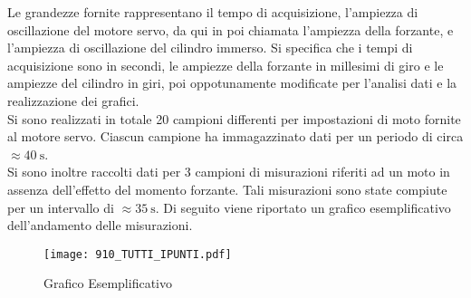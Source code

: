 \documentclass[a4paper,11pt,oneside]{article}
\begin{document}
\begin{table}[h!]
    \centering
    \caption{Corrispondenza Campione-Frequenza}
    \label{tab:corrispondenza_campione_frequenza}
\end{table}

\newpage
Le grandezze fornite rappresentano il tempo di acquisizione, l'ampiezza di oscillazione del motore servo, da qui in poi chiamata l'ampiezza della forzante, e l'ampiezza di oscillazione del cilindro immerso. Si specifica che i tempi di acquisizione sono in secondi, le ampiezze della forzante in millesimi di giro e le ampiezze del cilindro in giri, poi oppotunamente modificate per l'analisi dati e la realizzazione dei grafici.\\
Si sono realizzati in totale 20 campioni differenti per impostazioni di moto fornite al  motore servo. Ciascun campione ha immagazzinato dati per un periodo di circa $\approx \SI{40}{\second}$.\\
Si sono inoltre raccolti dati per 3 campioni di misurazioni riferiti ad un moto in assenza dell'effetto del momento forzante. Tali misurazioni sono state compiute per un intervallo di $\approx  \SI{35}{\second}$.
Di seguito viene riportato un grafico esemplificativo dell'andamento delle misurazioni.




\begin{figure}[h!]
    \centering
    \label{fig:grafico_esempio}
    \caption{Grafico Esemplificativo}
    \texttt{[image: 910\_TUTTI\_IPUNTI.pdf]}
\end{figure}
\end{document}
